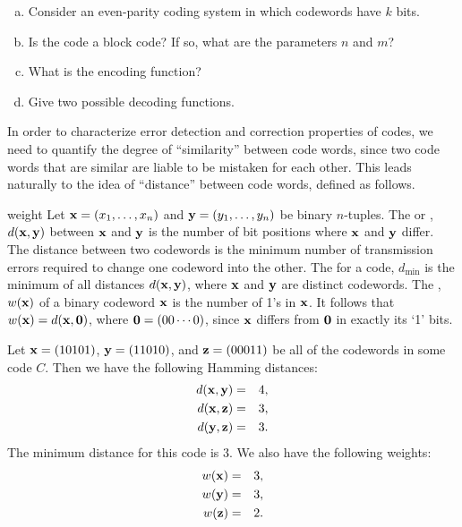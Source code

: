 \begin{exercise}{}
\begin{enumerate}[(a)]
\item
Consider an even-parity coding system in which codewords have $k$ bits. 
\item
Is the code a block code? If so, what are the parameters $n$ and $m$? 
\item
What is the encoding function? 
\item
Give two possible decoding functions.
\end{enumerate}
\end{exercise}

In order to characterize error detection and correction properties of codes, we need to quantify the degree of ``similarity'' between code words, since two code words that are similar are liable to be mistaken for each other. This leads naturally to the idea of ``distance'' between code words, defined as follows.

\begin{defn}{weight} 
Let ${\bold x} = (x_1, \ldots, x_n)$ and ${\bold y} = (y_1, \ldots,
y_n)$ be binary $n$-tuples. The  or , $d({\bold x}, {\bold
y})$ between ${\bold x}$ and ${\bold y}$ is
the number of bit positions where ${\bold x}$ and ${\bold y}$ differ. The
distance between two codewords is the minimum number of transmission
errors required to change one codeword into the other. The
 for a code,
$d_{\min}$ is the minimum of all distances
$d({\bold x}, {\bold y})$, where ${\bold x}$ and ${\bold y}$ are
distinct codewords. The ,
$w({\bold x})$ of a binary codeword ${\bold x}$ is
the number of 1's in ${\bold x}$. It follows that $w({\bold x}) = d({\bold
x}, {\bold 0})$, where ${\bold 0} = (00 \cdots 0)$, since ${\bold x}$ differs from ${\bold 0}$ in exactly its `1' bits.
\end{defn} 
 
\begin{example}{}
Let ${\bold x} = (10101)$, ${\bold y} = (11010)$, and ${\bold z} =
(00011)$ be all of the codewords in some code $C$. Then we have the
following Hamming distances: 
\begin{eqnarray*}
d({\bold x},{\bold y}) & = & 4, \\
d({\bold x},{\bold z}) & = & 3, \\
d({\bold y},{\bold z}) & = & 3.
\end{eqnarray*}
The minimum distance  for this code is 3. We also have the
following weights: 
\begin{eqnarray*}
w({\bold x}) & = & 3, \\
w({\bold y}) & = & 3, \\
w({\bold z}) & = & 2.
\end{eqnarray*}
\end{example}
 
